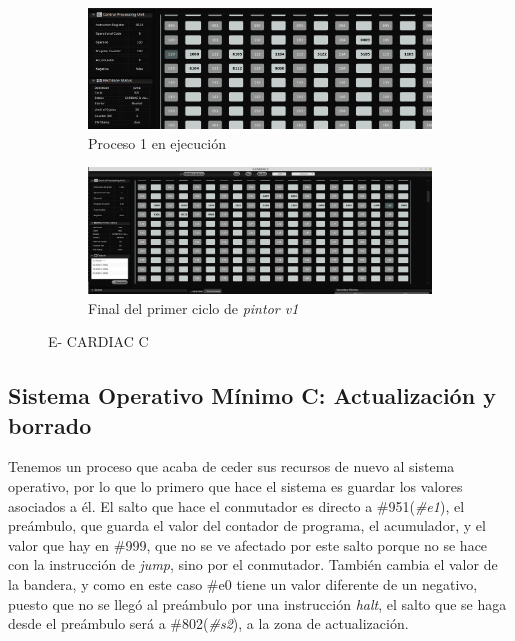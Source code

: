 \documentclass[letterpaper,12pt,oneside]{book}
\begin{document}
		\begin{figure}[h]
            \centering
            \begin{subfigure}[b]{0.50\textwidth}
                \centering
                \includegraphics[scale=0.4,angle=90]{media/CARDIACC/proceso1Exec1P1.png}
                \caption{Proceso 1 en ejecución}
                \label{fig:proceso1ExecP1}
            \end{subfigure}
            \hfill
            \begin{subfigure}[b]{0.45\textwidth}
                \centering
                \includegraphics[scale=0.28,angle=90]{media/CARDIACC/proceso1Exec1P1Final.png}
                \caption{Final del primer ciclo de \textit{pintor v1}}
                \label{fig:proceso1Exec1P1Final}
            \end{subfigure}
            \caption{E- CARDIAC C}
            \label{fig:side_by_side}
        \end{figure}
		
		\clearpage		

        \subsection{Sistema Operativo Mínimo C: Actualización y borrado}
        
		
		
		Tenemos un proceso que acaba de ceder sus recursos de nuevo al sistema operativo, por lo que lo primero que hace el sistema es guardar los
		valores asociados a él. El salto que hace el conmutador es directo a \#951(\textit{\#e1}), el preámbulo, que guarda
		el valor del contador de programa, el acumulador, y el valor que hay en \#999, que no se ve afectado por este salto porque no se hace
		con la instrucción de \textit{jump}, sino por el conmutador. También cambia el valor de la bandera, y como en este caso
		\#e0 tiene un valor diferente de un negativo, puesto que no se llegó al preámbulo por una instrucción \textit{halt},
		el salto que se haga desde el preámbulo será a \#802(\textit{\#s2}), a la zona de actualización.
  
\end{document}
